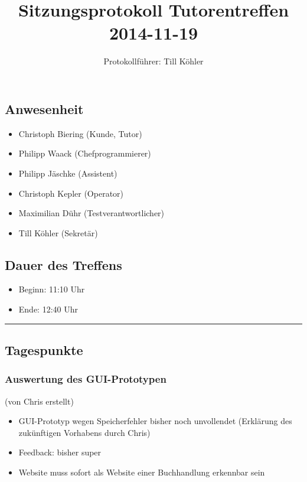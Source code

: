 \documentclass[12pt,a4paper]{article}
\author{Protokollführer: Till Köhler}
\title{Sitzungsprotokoll Tutorentreffen 2014-11-19}
\date{}
\begin{document}
\maketitle

\subsection*{Anwesenheit}
\medskip
\begin{itemize}
\item Christoph Biering (Kunde, Tutor)
\item Philipp Waack (Chefprogrammierer)
\item Philipp Jäschke (Assistent)
\item Christoph Kepler (Operator)
\item Maximilian Dühr (Testverantwortlicher)
\item Till Köhler (Sekretär)
\end{itemize}

\subsection*{Dauer des Treffens}
\medskip
\begin{itemize}
\item Beginn: 11:10 Uhr
\item Ende: 12:40 Uhr
\end{itemize}

\noindent\rule{\textwidth}{1pt}

\subsection*{Tagespunkte}
\medskip

\subsubsection*{Auswertung des GUI-Prototypen}
(von Chris erstellt)
\begin{itemize}
\item GUI-Prototyp wegen Speicherfehler bisher noch unvollendet (Erklärung des zukünftigen Vorhabens durch Chris)
\item Feedback: bisher super
\item Website muss sofort als Website einer Buchhandlung erkennbar sein
\end{itemize}
\end{document}
